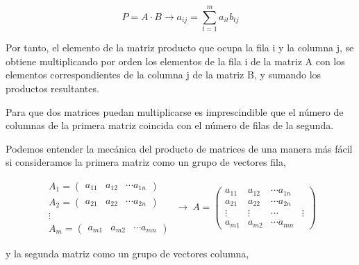 \begin{equation*}
P=A\cdot B \rightarrow a_{ij}=\sum_{t=1}^m a_{it}b_{tj}
\end{equation*}
\begin{paracol}{2}
Por tanto, el elemento de la matriz producto que ocupa la fila i y la columna j, se obtiene multiplicando por orden los elementos de la fila i de la matriz A con los elementos correspondientes de la columna j de la matriz B, y sumando los productos resultantes.

Para que dos matrices puedan multiplicarse es imprescindible que el número de columnas de la primera matriz coincida con el número de filas de la segunda.

Podemos entender la mecánica del producto de matrices de una manera más fácil si consideramos  la primera matriz como un grupo de vectores fila,
\end{paracol}

\begin{equation*}
\begin{aligned}
A_1=\begin{pmatrix}
a_{11}& a_{12}& \cdots a_{1n}
\end{pmatrix}\\
A_2=\begin{pmatrix}
a_{21}& a_{22}& \cdots a_{2n}
\end{pmatrix}\\
\vdots \  \ \   \  \  \  \ \ \ \ \\
A_m=\begin{pmatrix}
a_{m1}& a_{m2}& \cdots a_{mn}
\end{pmatrix}
\end{aligned} \ \rightarrow \ 
A=\begin{pmatrix}
a_{11}& a_{12}& \cdots a_{1n}\\
a_{21}& a_{22}& \cdots a_{2n}\\
\vdots& \vdots& \cdots& \vdots \\
a_{m1}& a_{m2}& \cdots a_{mn}
\end{pmatrix}
\end{equation*}
\begin{paracol}{2}
y la segunda matriz como un grupo de vectores columna,    
\end{paracol}

